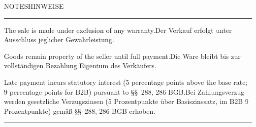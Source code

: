\documentclass[a4paper,10pt]{article}
\newcommand{\metalabel}[1]{%
  {\fontsize{6pt}{7pt}\selectfont\textcolor{midgray}{\MakeUppercase{#1}}}%
}
\newcommand{\grayrule}{\noindent\textcolor{lightgray}{\rule{\linewidth}{0.4pt}}}
\begin{document}
\noindent
\begin{minipage}[t]{\linewidth}
  \metalabel{\ifEnglish Notes\else Hinweise\fi}\\[1.5pt]
  \textcolor{brand}{\rule{1.1cm}{0.7pt}}

  \vspace{1mm}
  \ifdefempty{\invoiceSalutation}{}{{\small\invoiceSalutation}\par\vspace{1mm}}
  \ifdefempty{\invoiceText}{}{{\small\invoiceText}\par\vspace{1mm}}
  \ifdefempty{\invoiceClosing}{}{{\small\invoiceClosing}\par\vspace{1mm}}
  \ifdefempty{\signatureName}{}{{\small\signatureName}\par}

  \ifShowWarrantyExcluded
    \par\vspace{2mm}
    {\fontsize{7.5pt}{9pt}\selectfont\textcolor{midgray}{%
      \ifEnglish The sale is made under exclusion of any warranty.\else Der Verkauf erfolgt unter Ausschluss jeglicher Gewährleistung.\fi}}
  \fi
  \ifShowRetentionOfTitle
    \par\vspace{1mm}
    {\fontsize{7.5pt}{9pt}\selectfont\textcolor{midgray}{%
      \ifEnglish Goods remain property of the seller until full payment.\else Die Ware bleibt bis zur vollständigen Bezahlung Eigentum des Verkäufers.\fi}}
  \fi
  \ifShowLateFeeWarning
    \par\vspace{1mm}
    {\fontsize{7.5pt}{9pt}\selectfont\textcolor{midgray}{%
      \ifEnglish Late payment incurs statutory interest (5 percentage points above the base rate; 9 percentage points for B2B) pursuant to \S\S\ 288, 286 BGB.\else Bei Zahlungsverzug werden gesetzliche Verzugszinsen (5 Prozentpunkte über Basiszinssatz, im B2B 9 Prozentpunkte) gemäß \S\S\ 288, 286 BGB erhoben.\fi}}
  \fi
\end{minipage}

\vspace{1.5mm}
\grayrule

\vspace{1.5mm}
\end{document}
